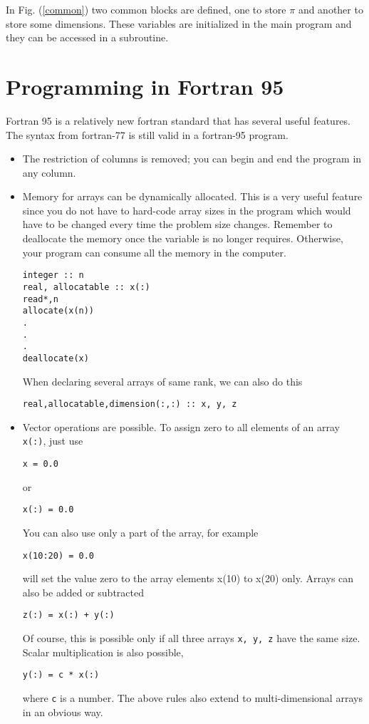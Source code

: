 \documentclass[11pt,oneside]{amsart}
\begin{document}
In Fig. (\ref{common}) two common blocks are defined, one to store $\pi$ and another to store some dimensions. These variables are initialized in the main program and they can be accessed in a subroutine.

\section{Programming in Fortran 95}
\label{f95}
Fortran 95 is a relatively new fortran standard that has several useful features. The syntax from fortran-77 is still valid in a fortran-95 program.

\begin{itemize}

\item The restriction of columns is removed; you can begin and end the program in any column.

\item Memory for arrays can be dynamically allocated. This is a very useful feature since you do not have to hard-code array sizes in the program which would have to be changed every time the problem size changes. Remember to deallocate the memory once the variable is no longer requires. Otherwise, your program can consume all the memory in the computer.
\begin{verbatim}
integer :: n
real, allocatable :: x(:)
read*,n
allocate(x(n))
.
.
.
deallocate(x)
\end{verbatim}
When declaring several arrays of same rank, we can also do this
\begin{verbatim}
real,allocatable,dimension(:,:) :: x, y, z
\end{verbatim}

\item Vector operations are possible. To assign zero to all elements of an array {\tt x(:)}, just use
\begin{verbatim}
x = 0.0
\end{verbatim}
or
\begin{verbatim}
x(:) = 0.0
\end{verbatim}
You can also use only a part of the array, for example
\begin{verbatim}
x(10:20) = 0.0
\end{verbatim}
will set the value zero to the array elements x(10) to x(20) only. Arrays can also be added or subtracted
\begin{verbatim}
z(:) = x(:) + y(:)
\end{verbatim}
Of course, this is possible only if all three arrays {\tt x, y, z} have the same size. Scalar multiplication is also possible,
\begin{verbatim}
y(:) = c * x(:)
\end{verbatim}
where {\tt c} is a number. The above rules also extend to multi-dimensional arrays in an obvious way.


\end{itemize}
\end{document}
